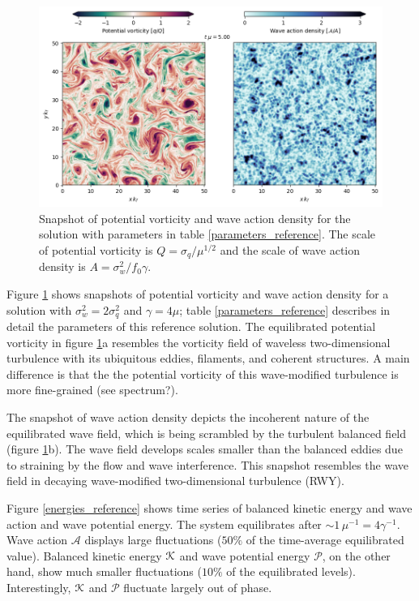 \documentclass[12pt]{article}
\renewcommand{\P}{\mathcal{P}}
\newcommand{\A}{  \mathcal{A}}
\begin{document}
\begin{figure}
\centering
\includegraphics[width=.925\textwidth]{figs/snapshots_pv_qg-niw_reference.png}
\caption{Snapshot of potential vorticity and wave action density for the solution
         with parameters in  table \ref{parameters_reference}. The scale of potential vorticity
         is $Q = \sigma_q/\mu^{1/2} $ and the scale of wave action density is
         $A = \sigma_w^2/f_0 \gamma$.}
        \label{snapshots_pv_qg-niw_reference}
\end{figure}

Figure \ref{snapshots_pv_qg-niw_reference} shows snapshots of potential vorticity and wave
action density for a solution with $\sigma_w^2 = 2\sigma_q^2$ and $\gamma = 4\mu$; table
\ref{parameters_reference} describes in detail the parameters of
this reference solution. The equilibrated potential vorticity in figure
\ref{snapshots_pv_qg-niw_reference}a  resembles the vorticity field
of waveless two-dimensional turbulence with its ubiquitous eddies, filaments,
and coherent structures. A main difference is that the the potential vorticity
of this wave-modified turbulence is more fine-grained (see spectrum?).

The snapshot of wave action density depicts the incoherent nature of the equilibrated
wave field, which is being scrambled by the turbulent balanced field
(figure \ref{snapshots_pv_qg-niw_reference}b). The wave field develops scales smaller
than the balanced eddies due to straining by the flow and wave interference.
This snapshot resembles the wave field in decaying wave-modified
two-dimensional turbulence (RWY).

Figure \eqref{energies_reference} shows time series of balanced kinetic energy
and wave action and wave potential energy. The system equilibrates after $\sim\!1
\, \mu^{-1} = 4 \gamma^{-1}$. Wave action $\A$ displays large fluctuations ($50\%$ of
 the time-average equilibrated value). Balanced kinetic energy $\mathcal{K}$
and wave potential energy $\P$, on the other hand, show much smaller fluctuations
($10\%$ of the equilibrated levels). Interestingly, $\mathcal{K}$ and $\P$ fluctuate
largely out of phase.
\end{document}
